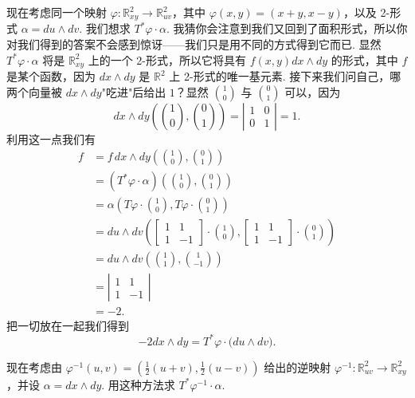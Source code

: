 现在考虑同一个映射 $\varphi:\mathbb{R}^2_{xy}\to\mathbb{R}^2_{uv}$，其中 $\varphi(x,y)=(x+y,x-y)$，以及 2-形式 $\alpha=du\wedge dv$. 我们想求 $T^*\varphi\cdot\alpha$. 我猜你会注意到我们又回到了面积形式，所以你对我们得到的答案不会感到惊讶——我们只是用不同的方式得到它而已. 显然 $T^*\varphi\cdot\alpha$ 将是 $\mathbb{R}^2_{xy}$ 上的一个 2-形式，所以它将具有 $f(x,y)dx\wedge dy$ 的形式，其中 $f$ 是某个函数，因为 $dx\wedge dy$ 是 $\mathbb{R}^2$ 上 2-形式的唯一基元素. 接下来我们问自己，哪两个向量被 $dx\wedge dy$"吃进"后给出 $1$？显然 $\binom{1}{0}$ 与 $\binom{0}{1}$ 可以，因为
\[
dx\wedge dy\left(\binom{1}{0},\binom{0}{1}\right)=\left|\begin{matrix}1&0\\0&1\end{matrix}\right|=1.
\]
利用这一点我们有
\begin{align*}
f&=f\,dx\wedge dy\left(\binom{1}{0},\binom{0}{1}\right)\\
&=(T^*\varphi\cdot\alpha)\left(\binom{1}{0},\binom{0}{1}\right)\\
&=\alpha\left(T\varphi\cdot\binom{1}{0},T\varphi\cdot\binom{0}{1}\right)\\
&=du\wedge dv\left(\begin{bmatrix}1&1\\1&-1\end{bmatrix}\cdot\binom{1}{0},\begin{bmatrix}1&1\\1&-1\end{bmatrix}\cdot\binom{0}{1}\right)\\
&=du\wedge dv\left(\binom{1}{1},\binom{1}{-1}\right)\\
&=\left|\begin{matrix}1&1\\1&-1\end{matrix}\right|\\
&=-2.
\end{align*}
把一切放在一起我们得到
\[
-2dx\wedge dy=T^*\varphi\cdot\bigl(du\wedge dv\bigr).
\]

\begin{question}\label{q:6-14}
现在考虑由 $\varphi^{-1}(u,v)=\left(\frac12(u+v),\frac12(u-v)\right)$ 给出的逆映射 $\varphi^{-1}:\mathbb{R}^2_{uv}\to\mathbb{R}^2_{xy}$，并设 $\alpha=dx\wedge dy$. 用这种方法求 $T^*\varphi^{-1}\cdot\alpha$.
\end{question}

